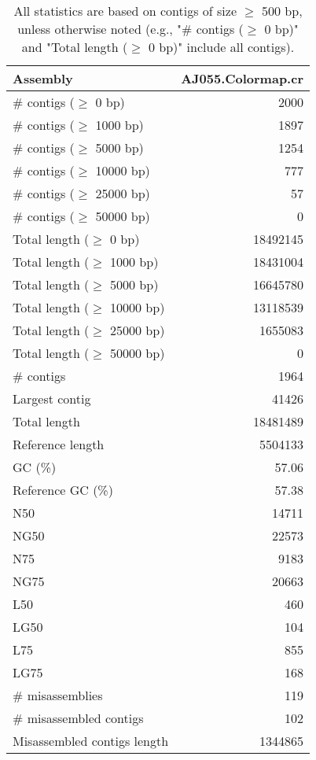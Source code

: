 \documentclass[12pt,a4paper]{article}
\begin{document}
\begin{table}[ht]
\begin{center}
\caption{All statistics are based on contigs of size $\geq$ 500 bp, unless otherwise noted (e.g., "\# contigs ($\geq$ 0 bp)" and "Total length ($\geq$ 0 bp)" include all contigs).}
\begin{tabular}{|l*{1}{|r}|}
\hline
Assembly & AJ055.Colormap.cr \\ \hline
\# contigs ($\geq$ 0 bp) & 2000 \\ \hline
\# contigs ($\geq$ 1000 bp) & 1897 \\ \hline
\# contigs ($\geq$ 5000 bp) & 1254 \\ \hline
\# contigs ($\geq$ 10000 bp) & 777 \\ \hline
\# contigs ($\geq$ 25000 bp) & 57 \\ \hline
\# contigs ($\geq$ 50000 bp) & 0 \\ \hline
Total length ($\geq$ 0 bp) & 18492145 \\ \hline
Total length ($\geq$ 1000 bp) & 18431004 \\ \hline
Total length ($\geq$ 5000 bp) & 16645780 \\ \hline
Total length ($\geq$ 10000 bp) & 13118539 \\ \hline
Total length ($\geq$ 25000 bp) & 1655083 \\ \hline
Total length ($\geq$ 50000 bp) & 0 \\ \hline
\# contigs & 1964 \\ \hline
Largest contig & 41426 \\ \hline
Total length & 18481489 \\ \hline
Reference length & 5504133 \\ \hline
GC (\%) & 57.06 \\ \hline
Reference GC (\%) & 57.38 \\ \hline
N50 & 14711 \\ \hline
NG50 & 22573 \\ \hline
N75 & 9183 \\ \hline
NG75 & 20663 \\ \hline
L50 & 460 \\ \hline
LG50 & 104 \\ \hline
L75 & 855 \\ \hline
LG75 & 168 \\ \hline
\# misassemblies & 119 \\ \hline
\# misassembled contigs & 102 \\ \hline
Misassembled contigs length & 1344865 \\ \hline

\end{tabular}
\end{center}
\end{table}
\end{document}
